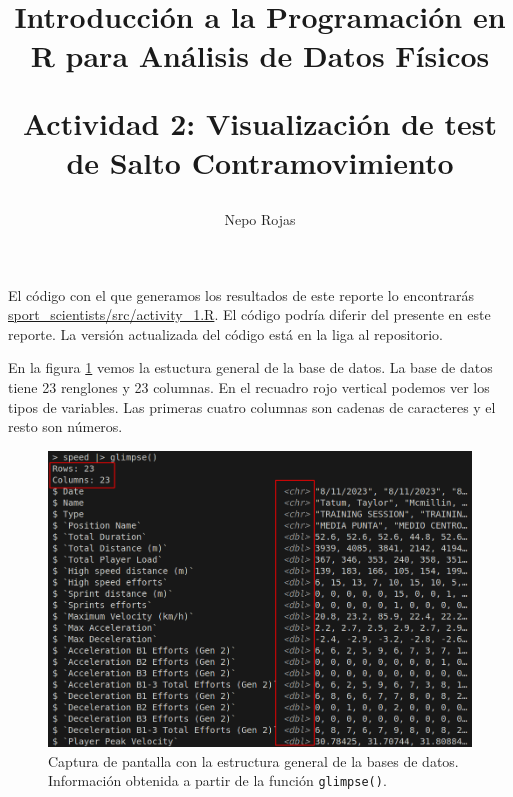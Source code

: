 

\author{Nepo Rojas}

\title{Introducción a la Programación en R para Análisis de Datos Físicos \\ \begin{large}
    Actividad 2: Visualización de test de Salto Contramovimiento \end{large}}



\maketitle

El código con el que generamos los resultados de este reporte lo encontrarás
\href{https://github.com/niesfutbol/sport_scientists/blob/develop/src/activity_1.R}{sport\_scientists/src/activity\_1.R}.
El código podría diferir del presente en este reporte. La versión actualizada del código está en la
liga al repositorio.

En la figura \ref{fig:genralStructure} vemos la estuctura general de la base de datos. La base de 
datos tiene 23 renglones y 23 columnas. En el recuadro rojo vertical podemos ver los tipos de
variables. Las primeras cuatro columnas son cadenas de caracteres y el resto son números.
\begin{figure}[H]
    \centering
\includegraphics[scale=0.6]{../static/activity_1_2.png}
\caption{Captura de pantalla con la estructura general de la bases de datos. Información obtenida a 
partir de la función \texttt{glimpse()}.}
\label{fig:genralStructure}
\end{figure}

